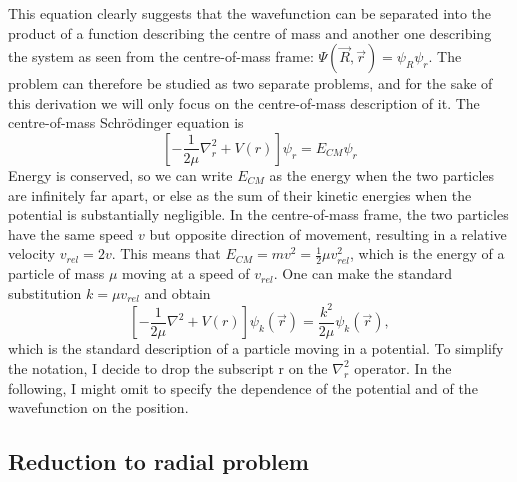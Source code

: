 This equation clearly suggests that the wavefunction can be separated into the product of a function describing the centre of mass and another one describing the system as seen from the centre-of-mass frame: \(\Psi (\vec{R},\vec{r}) = \psi_R \psi _r\). The problem can therefore be studied as two separate problems, and for the sake of this derivation we will only focus on the centre-of-mass description of it. The centre-of-mass Schrödinger equation is
\begin{equation}
	\left[- \frac{1}{2\mu }\nabla _r^2 + V(r)\right]\psi _r = E_{CM} \psi _r
\end{equation}
Energy is conserved, so we can write \(E_{CM} \) as the energy when the two particles are infinitely far apart, or else as the sum of their kinetic energies when the potential is substantially negligible. In the centre-of-mass frame, the two particles have the same speed \(v\) but opposite direction of movement, resulting in a relative velocity \(v_{rel} = 2v\). This means that \(E_{CM} = mv^2 = \frac{1}{2} \mu v_{rel}^2\), which is the energy of a particle of mass \(\mu \) moving at a speed of \(v_{rel} \). One can make the standard substitution \(k=\mu v_{rel} \) and obtain
\begin{equation}
	\left[- \frac{1}{2\mu } \nabla ^2 + V(r)\right] \psi _k (\vec{r}) = \frac{k^2}{2\mu } \psi _k (\vec{r}),
\end{equation}
which is the standard description of a particle moving in a potential. To simplify the notation, I decide to drop the subscript r on the \(\nabla _r ^2\) operator. In the following, I might omit to specify the dependence of the potential and of the wavefunction on the position.

\subsection*{Reduction to radial problem}

